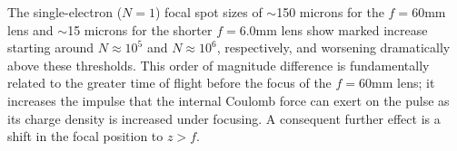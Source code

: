 The single-electron ($ N = 1 $) focal spot sizes of $\sim$150 microns for the $ f = 60 \text{mm} $ lens and $\sim$15 microns for the shorter $ f = 6.0 \text{mm} $ lens show marked increase starting around $ N \approx 10^{ 5 } $ and $ N \approx 10^{ 6 }$, respectively, and worsening dramatically above these thresholds.
This order of magnitude difference is fundamentally related to the greater time of flight before the focus of the $ f = 60\text{mm} $ lens; it increases the impulse that the internal Coulomb force can exert on the pulse as its charge density is increased under focusing.
A consequent further effect is a shift in the focal position to $ z > f $.
